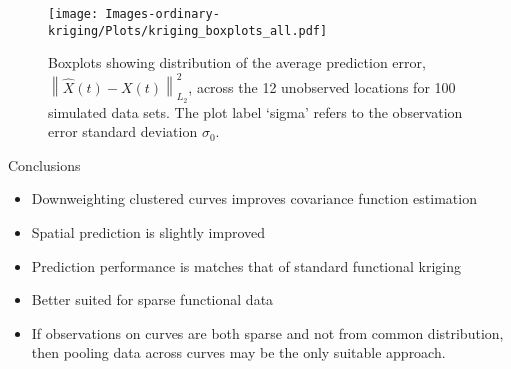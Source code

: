 \documentclass{beamer}
\newcommand{\norm}[1]{\left\|#1\right\|}
\begin{document}
\begin{frame}[t]{}
	\begin{figure}
		\begin{center}
			\texttt{[image: Images-ordinary-kriging/Plots/kriging\_boxplots\_all.pdf]}
		\end{center}
		\caption{Boxplots showing distribution of the average prediction error, $\norm{\hat{X}(t) - X(t)}^2_{L_2}$, across the 12 unobserved locations for 100 simulated data sets. The plot label `sigma' refers to the observation error standard deviation $\sigma_0$. }
	\end{figure}
\end{frame}

\begin{frame}[t]{Conclusions}
	\begin{itemize}
		\item Downweighting clustered curves improves covariance function estimation
		\item Spatial prediction is slightly improved
		\item Prediction performance is matches that of standard functional kriging
		\item Better suited for sparse functional data
		\item If observations on curves are both sparse and not from common distribution, then pooling data across curves may be the only suitable approach.
	\end{itemize}

\end{frame}


%
%
\end{document}
